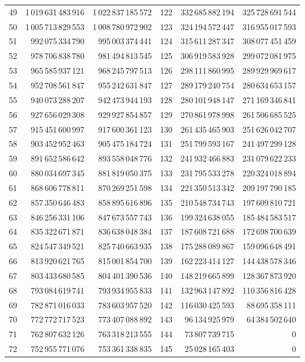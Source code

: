 \begin{longtable}{@{}r r r@{\qquad}r r r@{}}
49 & 1\,019\,631\,483\,916 & 1\,022\,837\,185\,572 & 122 & 332\,685\,882\,194 & 325\,728\,691\,544\\
50 & 1\,005\,713\,829\,553 & 1\,008\,780\,972\,902 & 123 & 324\,194\,572\,447 & 316\,955\,017\,593\\
51 & 992\,075\,334\,790 & 995\,003\,374\,441 & 124 & 315\,611\,287\,347 & 308\,077\,451\,459\\
52 & 978\,706\,838\,780 & 981\,494\,813\,545 & 125 & 306\,919\,583\,928 & 299\,072\,081\,975\\
53 & 965\,585\,937\,121 & 968\,245\,797\,513 & 126 & 298\,111\,860\,995 & 289\,929\,969\,617\\
54 & 952\,708\,561\,847 & 955\,242\,631\,847 & 127 & 289\,179\,240\,754 & 280\,634\,653\,157\\
55 & 940\,073\,288\,207 & 942\,473\,944\,193 & 128 & 280\,101\,948\,147 & 271\,169\,346\,841\\
56 & 927\,656\,029\,308 & 929\,927\,854\,857 & 129 & 270\,861\,978\,998 & 261\,506\,685\,525\\
57 & 915\,451\,600\,997 & 917\,600\,361\,123 & 130 & 261\,435\,465\,903 & 251\,626\,042\,707\\
58 & 903\,452\,952\,463 & 905\,475\,184\,724 & 131 & 251\,799\,593\,167 & 241\,497\,299\,128\\
59 & 891\,652\,586\,642 & 893\,558\,048\,776 & 132 & 241\,932\,466\,883 & 231\,079\,622\,233\\
60 & 880\,034\,697\,345 & 881\,819\,050\,375 & 133 & 231\,795\,533\,278 & 220\,324\,018\,894\\
61 & 868\,606\,778\,811 & 870\,269\,251\,598 & 134 & 221\,350\,513\,342 & 209\,197\,790\,185\\
62 & 857\,350\,646\,483 & 858\,895\,616\,896 & 135 & 210\,548\,734\,743 & 197\,609\,810\,721\\
63 & 846\,256\,331\,106 & 847\,673\,557\,743 & 136 & 199\,324\,638\,055 & 185\,484\,583\,517\\
64 & 835\,322\,671\,871 & 836\,638\,048\,384 & 137 & 187\,608\,721\,688 & 172\,698\,700\,639\\
65 & 824\,547\,349\,521 & 825\,740\,663\,935 & 138 & 175\,288\,089\,867 & 159\,096\,648\,491\\
66 & 813\,920\,621\,765 & 815\,001\,854\,700 & 139 & 162\,223\,414\,127 & 144\,438\,578\,346\\
67 & 803\,433\,680\,585 & 804\,401\,390\,536 & 140 & 148\,219\,665\,899 & 128\,367\,873\,920\\
68 & 793\,084\,619\,741 & 793\,934\,955\,833 & 141 & 132\,963\,147\,892 & 110\,356\,816\,428\\
69 & 782\,871\,016\,033 & 783\,603\,957\,520 & 142 & 116\,030\,425\,593 & 88\,695\,358\,111\\
70 & 772\,772\,717\,523 & 773\,407\,088\,892 & 143 & 96\,134\,925\,979 & 64\,384\,502\,640\\
71 & 762\,807\,632\,126 & 763\,318\,213\,555 & 144 & 73\,807\,739\,715 & 0\\
72 & 752\,955\,771\,076 & 753\,361\,338\,835 & 145 & 25\,028\,165\,403 & 0\\
\bottomrule
\end{longtable}

